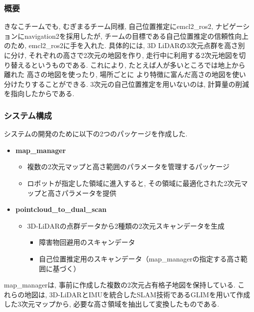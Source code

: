 \subsubsection{概要}

きなこチームでも, むぎまるチーム同様, 
自己位置推定にemcl2\_ros2, ナビゲーションにnavigation2を採用したが, 
チームの目標である自己位置推定の信頼性向上のため, 
emcl2\_ros2に手を入れた. 
具体的には, 3D LiDARの3次元点群を高さ別に分け, 
それぞれの高さで2次元の地図を作り, 
走行中に利用する2次元地図を切り替えるというものである. 
これにより, たとえば人が多いところでは地上から離れた
高さの地図を使ったり, 場所ごとに
より特徴に富んだ高さの地図を使い分けたりすることができる. 
3次元の自己位置推定を用いないのは, 
計算量の削減を指向したからである. 



\subsubsection{システム構成}
システムの開発のために以下の2つのパッケージを作成した. 

\begin{itemize}
  \item \textbf{map\_manager}
    \begin{itemize}
      \item 複数の2次元マップと高さ範囲のパラメータを管理するパッケージ
      \item ロボットが指定した領域に進入すると, その領域に最適化された2次元マップと高さパラメータを提供
    \end{itemize}
  \item \textbf{pointcloud\_to\_dual\_scan}
    \begin{itemize}
      \item 3D-LiDARの点群データから2種類の2次元スキャンデータを生成
        \begin{itemize}
          \item 障害物回避用のスキャンデータ
          \item 自己位置推定用のスキャンデータ（map\_managerの指定する高さ範囲に基づく）
        \end{itemize}
    \end{itemize}
\end{itemize}
map\_managerは, 事前に作成した複数の2次元占有格子地図を保持している. 
これらの地図は, 3D-LiDARとIMUを統合したSLAM技術であるGLIMを用いて作成した3次元マップから, 必要な高さ領域を抽出して変換したものである. 

